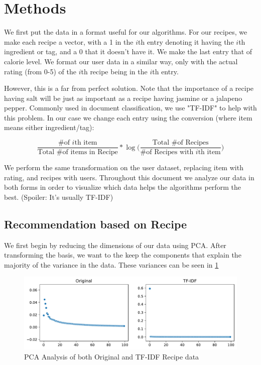 \documentclass[11pt]{article}
\newcommand*\textfrac[2]{
  \frac{\text{#1}}{\text{#2}}
}
\begin{document}
\section{Methods}

We first put the data in a format useful for our algorithms. For our recipes, we make each recipe a vector, with a 1 in the $i$th entry denoting it having the $i$th ingredient or tag, and a 0 that it doesn't have it. We make the last entry that of calorie level. We format our user data in a similar way, only with the actual rating (from 0-5) of the $i$th recipe being in the $i$th entry.

However, this is a far from perfect solution. Note that the importance of a recipe having salt will be just as important as a recipe having jasmine or a jalapeno pepper. Commonly used in document classification, we use "TF-IDF" to help with this problem. In our case we change each entry using the conversion (where item means either ingredient/tag):

$$\textfrac{\# of $i$th item}{Total \# of items in Recipe} * \log \Big( \textfrac{Total \# of Recipes}{\# of Recipes with $i$th item} \Big)$$

We perform the same transformation on the user dataset, replacing item with rating, and recipes with users. Throughout this document we analyze our data in both forms in order to visualize which data helps the algorithms perform the best. (Spoiler: It's usually TF-IDF)

\subsection{Recommendation based on Recipe}
We first begin by reducing the dimensions of our data using PCA. After transforming the basis, we want to the keep the components that explain the majority of the variance in the data. These variances can be seen in \ref{fig:pca}
\begin{figure}[t]
\centering
\includegraphics[width=1\textwidth]{figs/pca.pdf}
\caption{PCA Analysis of both Original and TF-IDF Recipe data}
\label{fig:pca}
\end{figure}
\end{document}

